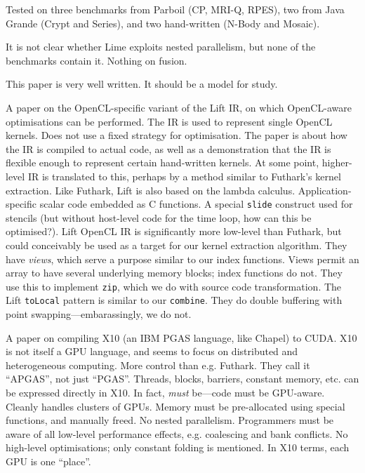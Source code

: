 \documentclass[a4paper, oneside, final]{memoir}
\begin{document}
Tested on three benchmarks from Parboil (CP, MRI-Q, RPES), two from
Java Grande (Crypt and Series), and two hand-written (N-Body and
Mosaic).

It is not clear whether Lime exploits nested parallelism, but none of
the benchmarks contain it.  Nothing on fusion.

This paper is very well written.  It should be a model for study.

\begin{quote}
\end{quote}

A paper on the OpenCL-specific variant of the Lift IR, on which
OpenCL-aware optimisations can be performed.  The IR is used to
represent single OpenCL kernels.  Does not use a fixed strategy for
optimisation.  The paper is about how the IR is compiled to actual
code, as well as a demonstration that the IR is flexible enough to
represent certain hand-written kernels.  At some point, higher-level
IR is translated to this, perhaps by a method similar to Futhark's
kernel extraction.  Like Futhark, Lift is also based on the lambda
calculus.  Application-specific scalar code embedded as C functions.
A special \texttt{slide} construct used for stencils (but without
host-level code for the time loop, how can this be optimised?).  Lift
OpenCL IR is significantly more low-level than Futhark, but could
conceivably be used as a target for our kernel extraction algorithm.
They have \textit{views}, which serve a purpose similar to our index
functions.  Views permit an array to have several underlying memory
blocks; index functions do not.  They use this to implement
\texttt{zip}, which we do with source code transformation.  The Lift
\texttt{toLocal} pattern is similar to our \texttt{combine}.  They do
double buffering with point swapping---embarassingly, we do not.

\begin{quote}
\end{quote}

A paper on compiling X10 (an IBM PGAS language, like Chapel) to CUDA.
X10 is not itself a GPU language, and seems to focus on distributed
and heterogeneous computing.  More control than e.g. Futhark.  They
call it ``APGAS'', not just ``PGAS''.  Threads, blocks, barriers,
constant memory, etc. can be expressed directly in X10.  In fact,
\textit{must} be---code must be GPU-aware.  Cleanly handles clusters
of GPUs.  Memory must be pre-allocated using special functions, and
manually freed.  No nested parallelism.  Programmers must be aware of
all low-level performance effects, e.g. coalescing and bank conflicts.
No high-level optimisations; only constant folding is mentioned.  In
X10 terms, each GPU is one ``place''.
\end{document}
